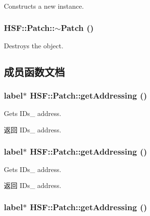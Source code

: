 Constructs a new instance. \hypertarget{classHSF_1_1Patch_ac4002381f5600d00ce48e8d2a1d979c4}{
\subsubsection[{$\sim$Patch}]{\setlength{\rightskip}{0pt plus 5cm}HSF::Patch::$\sim$Patch ()}}
\label{classHSF_1_1Patch_ac4002381f5600d00ce48e8d2a1d979c4}


Destroys the object. 

\subsection{成员函数文档}
\hypertarget{classHSF_1_1Patch_a77780024fa9be8ca1de644d4ac8c3478}{
\subsubsection[{getAddressing}]{\setlength{\rightskip}{0pt plus 5cm}label$\ast$ HSF::Patch::getAddressing ()}}
\label{classHSF_1_1Patch_a77780024fa9be8ca1de644d4ac8c3478}


Gets IDs\_\- address. \begin{DoxyReturn}{返回}
IDs\_\- address. 
\end{DoxyReturn}
\hypertarget{classHSF_1_1Patch_a77780024fa9be8ca1de644d4ac8c3478}{
\subsubsection[{getAddressing}]{\setlength{\rightskip}{0pt plus 5cm}label$\ast$ HSF::Patch::getAddressing ()}}
\label{classHSF_1_1Patch_a77780024fa9be8ca1de644d4ac8c3478}


Gets IDs\_\- address. \begin{DoxyReturn}{返回}
IDs\_\- address. 
\end{DoxyReturn}
\hypertarget{classHSF_1_1Patch_a77780024fa9be8ca1de644d4ac8c3478}{
\subsubsection[{getAddressing}]{\setlength{\rightskip}{0pt plus 5cm}label$\ast$ HSF::Patch::getAddressing ()}}
\label{classHSF_1_1Patch_a77780024fa9be8ca1de644d4ac8c3478}


